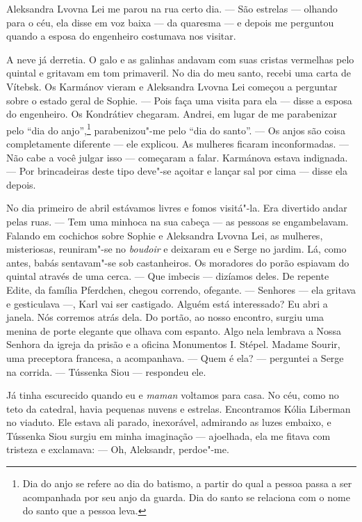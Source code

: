 Aleksandra Lvovna Lei me parou na rua certo dia. --- São estrelas ---
olhando para o céu, ela disse em voz baixa --- da quaresma --- e depois
me perguntou quando a esposa do engenheiro costumava nos visitar.

A neve já derretia. O galo e as galinhas andavam com suas cristas
vermelhas pelo quintal e gritavam em tom primaveril. No dia do meu
santo, recebi uma carta de Vítebsk. Os Karmánov vieram e Aleksandra
Lvovna Lei começou a perguntar sobre o estado geral de Sophie. --- Pois
faça uma visita para ela --- disse a esposa do engenheiro. Os Kondrátiev
chegaram. Andrei, em lugar de me parabenizar pelo ``dia do
anjo'',\footnote{Dia do anjo se refere ao dia do batismo, a partir do
  qual a pessoa passa a ser acompanhada por seu anjo da guarda. Dia do
  santo se relaciona com o nome do santo que a pessoa leva.}
parabenizou"-me pelo ``dia do santo''. --- Os anjos são coisa
completamente diferente --- ele explicou. As mulheres ficaram
inconformadas. --- Não cabe a você julgar isso --- começaram a falar.
Karmánova estava indignada. --- Por brincadeiras deste tipo deve"-se
açoitar e lançar sal por cima --- disse ela depois.

No dia primeiro de abril estávamos livres e fomos visitá"-la. Era
divertido andar pelas ruas. --- Tem uma minhoca na sua cabeça --- as
pessoas se engambelavam. Falando em cochichos sobre Sophie e Aleksandra
Lvovna Lei, as mulheres, misteriosas, reuniram"-se no \emph{boudoir} e
deixaram eu e Serge no jardim. Lá, como antes, babás sentavam"-se sob
castanheiros. Os moradores do porão espiavam do quintal através de uma
cerca. --- Que imbecis --- dizíamos deles. De repente Edite, da família
Pferdchen, chegou correndo, ofegante. --- Senhores --- ela gritava e
gesticulava ---, Karl vai ser castigado. Alguém está interessado? Eu
abri a janela. Nós corremos atrás dela. Do portão, ao nosso encontro,
surgiu uma menina de porte elegante que olhava com espanto. Algo nela
lembrava a Nossa Senhora da igreja da prisão e a oficina Monumentos I.
Stépel. Madame Sourir, uma preceptora francesa, a acompanhava. --- Quem
é ela? --- perguntei a Serge na corrida. --- Tússenka Siou --- respondeu
ele.

Já tinha escurecido quando eu e \emph{maman} voltamos para casa. No céu,
como no teto da catedral, havia pequenas nuvens e estrelas. Encontramos
Kólia Liberman no viaduto. Ele estava ali parado, inexorável, admirando
as luzes embaixo, e Tússenka Siou surgiu em minha imaginação ---
ajoelhada, ela me fitava com tristeza e exclamava: --- Oh, Aleksandr,
perdoe"-me.


